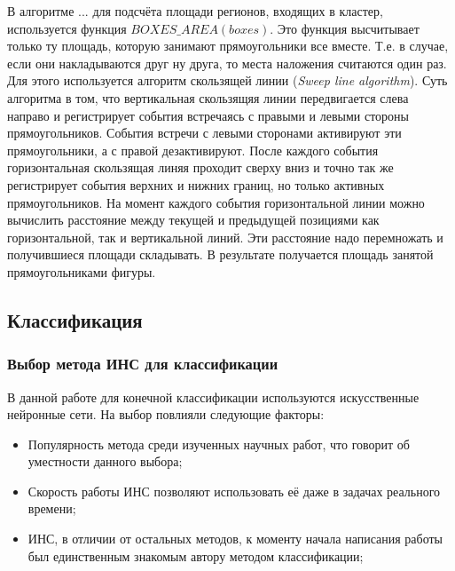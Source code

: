 \documentclass[12pt]{report}
\newenvironment{myItemize}{
 	\vspace{-10pt}
	\begin{itemize}[nolistsep]
}{\end{itemize}}
\begin{document}
В алгоритме ...  для подсчёта площади регионов, входящих в кластер, используется функция $BOXES\_AREA(boxes)$. Это 
функция высчитывает только ту площадь, которую занимают прямоугольники все вместе. Т.е. в случае, если они 
накладываются друг ну друга, то места наложения считаются один раз. Для этого используется алгоритм скользящей 
линии 
(\textit{Sweep line algorithm}). Суть алгоритма в том, что вертикальная скользящяя линии передвигается слева 
направо 
и регистрирует события встречаясь с правыми и левыми стороны прямоугольников. События встречи с левыми сторонами 
активируют эти прямоугольники, а с правой дезактивируют. После каждого события горизонтальная скользящая линяя 
проходит сверху вниз и точно так же регистрирует события верхних и нижних границ, но только активных 
прямоугольников. 
На момент каждого события горизонтальной линии можно вычислить расстояние между текущей и предыдущей позициями как 
горизонтальной, так и вертикальной линий. Эти расстояние надо перемножать и получившиеся площади складывать. В 
результате получается площадь занятой прямоугольниками фигуры.


\subsection{Классификация}

\subsubsection{Выбор метода ИНС для классификации}
В данной работе для конечной классификации используются искусственные нейронные сети. На выбор повлияли следующие 
факторы:
\begin{myItemize}
\item Популярность метода среди изученных научных работ, что говорит об уместности данного выбора;
\item Скорость работы ИНС позволяют использовать её даже в задачах реального времени;
\item ИНС, в отличии от остальных методов, к моменту начала написания работы был единственным знакомым автору 
методом 
классификации;
\end{myItemize}
\end{document}
